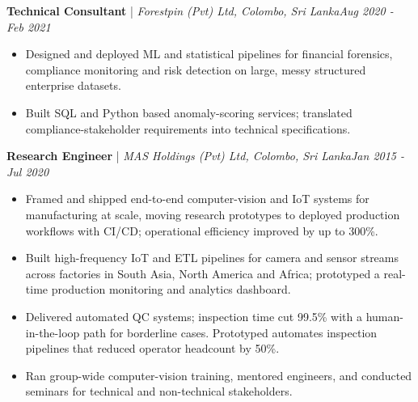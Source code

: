\documentclass[11pt]{article}
\newenvironment{cvrole}[5]{%
  \par\noindent\textbf{\large #1} | \textit{\small #2, #3}\hfill \textit{\small #4 - #5}\par
  \begin{itemize}[leftmargin=2em, itemsep=-0.3em, topsep=-0.5em]%
}{%
  \end{itemize}\par\noindent\mbox{}\par\vspace{0.1em}%
}
\begin{document}
\begin{cvrole}{Technical Consultant}{Forestpin (Pvt) Ltd}{Colombo, Sri Lanka}{Aug 2020}{Feb 2021}
    \item Designed and deployed ML and statistical pipelines for financial forensics, compliance monitoring and risk detection on large, messy structured enterprise datasets.
    \item Built SQL and Python based anomaly-scoring services; translated compliance-stakeholder requirements into technical specifications.
\end{cvrole}

\begin{cvrole}{Research Engineer}{MAS Holdings (Pvt) Ltd}{Colombo, Sri Lanka}{Jan 2015}{Jul 2020}
    \item Framed and shipped end-to-end computer-vision and IoT systems for manufacturing at scale, moving research prototypes to deployed production workflows with CI/CD; operational efficiency improved by up to 300\%.
    \item Built high-frequency IoT and ETL pipelines for camera and sensor streams across factories in South Asia, North America and Africa; prototyped a real-time production monitoring and analytics dashboard.
    \item Delivered automated QC systems; inspection time cut 99.5\% with a human-in-the-loop path for borderline cases. Prototyped automates inspection pipelines that reduced operator headcount by 50\%.
    \item Ran group-wide computer-vision training, mentored engineers, and conducted seminars for technical and non-technical stakeholders.
\end{cvrole}
\end{document}
